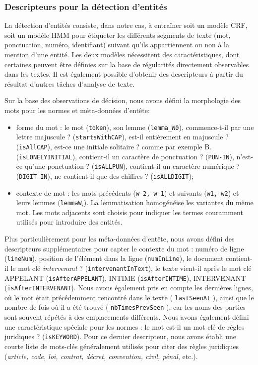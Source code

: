 \subsubsection{Descripteurs pour la détection d'entités}

La détection d'entités consiste, dans notre cas, à entraîner soit un modèle CRF, soit un modèle HMM pour étiqueter les différents segments de texte (mot, ponctuation, numéro, identifiant) suivant qu'ils appartiennent ou non à la mention d'une entité. Les deux modèles nécessitent des caractéristiques, dont certaines peuvent être définies sur la base de régularités directement observables dans les textes. Il est également possible d'obtenir des descripteurs à partir du résultat d'autres tâches d'analyse de texte.

Sur la base des observations de décision, nous avons défini la morphologie des mots pour les normes et méta-données d'entête:
\begin{itemize}
	\item forme du mot : le mot (\verb|token|), son lemme (\verb|lemma_W0|), \og commence-t-il par une lettre majuscule ? \fg{} (\verb|startsWithCAP|), \og est-il entièrement en majuscule ? \fg{} (\verb|isAllCAP|), \og est-ce une initiale solitaire ? \fg{} comme par exemple \og B. \fg{} (\verb|isLONELYINITIAL|), \og contient-il un caractère de ponctuation ? \fg{} (\verb|PUN-IN|), \og n'est-ce qu'une ponctuation ? \fg{} (\verb|isALLPUN|), \og contient-il un caractère numérique ? \fg{} (\verb|DIGIT-IN|),  \og ne contient-il que 
	des chiffres ? \fg{} (\verb|isALLDIGIT|);
	\item contexte de mot : les mots précédents (\verb|w-2, w-1|) et suivants (\verb|w1, w2|) et leurs lemmes (\verb|lemmaW|$_i$). La lemmatisation homogénéise les variantes du même mot. Les mots adjacents sont choisis pour indiquer les termes couramment utilisés pour introduire des entités.
\end{itemize}

Plus particulièrement pour les méta-données d'entête, nous avons défini des descripteurs supplémentaires pour capter le contexte du mot : numéro de ligne (\verb|lineNum|), position de l'élément dans la ligne (\verb|numInLine|), \og le document contient-il le mot clé \textit{intervenant} ? \fg{} (\verb|intervenantInText|), le texte vient-il après le mot clé \og APPELANT \fg{} (\verb|isAfterAPPELANT|), \og INTIME \fg{} (\verb|isAfterINTIME|), \og INTERVENANT \fg{} (\verb|isAfterINTERVENANT|). Nous avons également pris en compte les dernières lignes, où le mot était précédemment rencontré dans le texte ( \verb|lastSeenAt| ), ainsi que le nombre de fois où il a été trouvé ( \verb|nbTimesPrevSeen| ), car les noms des parties sont souvent répétés à des emplacements différents. Nous avons également défini une caractéristique spéciale pour les normes : \og le mot est-il un mot clé de règles juridiques ? \fg{} (\verb|isKEYWORD|). Pour ce dernier descripteur, nous avons établi une courte liste de mots-clés généralement utilisés pour citer des règles juridiques (\textit{article, code, loi, contrat, décret, convention, civil, pénal}, etc.).

